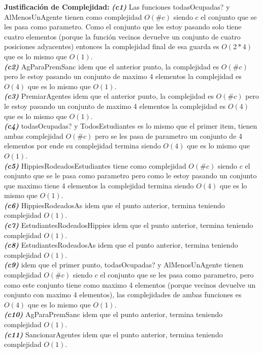 \textbf{Justificación de Complejidad:} \textit{\textbf{(c1)}} Las funciones todasOcupadas? y AlMenosUnAgente tienen como complejidad $O(\#c)$ siendo $c$ el conjunto que se les pasa como parametro. Como el conjunto que les estoy pasando solo tiene cuatro elementos (porque la función vecinos devuelve un conjunto de cuatro posiciones adyacentes) entonces la complejidad final de esa guarda es $O(2*4)$ que es lo mismo que $O(1)$. \\
\textit{\textbf{(c2)}} AgParaPremSanc idem que el anterior punto, la complejidad es $O(\#c)$ pero le estoy pasando un conjunto de maximo 4  elementos la complejidad es $O(4)$ que es lo mismo que $O(1)$. \\
\textit{\textbf{(c3)}} PremiarAgentes idem que el anterior punto, la complejidad es $O(\#c)$ pero le estoy pasando un conjunto de maximo 4 elementos la complejidad es $O(4)$ que es lo mismo que $O(1)$. \\
\textit{\textbf{(c4)}} todasOcupadas? y TodosEstudiantes es lo mismo que el primer item, tienen ambas complejidad $O(\#c)$ pero se les pasa de parametro un conjunto de 4 elementos por ende su complejidad termina siendo $O(4)$ que es lo mismo que $O(1)$. \\
\textit{\textbf{(c5)}} HippiesRodeadosEstudiantes tiene como complejidad $O(\#c)$ siendo $c$ el conjunto que se le pasa como parametro pero como le estoy pasando un conjunto que maximo tiene 4 elementos la complejidad termina siendo $O(4)$ que es lo mismo que $O(1)$. \\
\textit{\textbf{(c6)}} HippiesRodeadosAs idem que el punto anterior, termina teniendo complejidad $O(1)$. \\
\textit{\textbf{(c7)}} EstudiantesRodeadosHippies idem que el punto anterior, termina teniendo complejidad $O(1)$. \\
\textit{\textbf{(c8)}} EstudiantesRodeadosAs idem que el punto anterior, termina teniendo complejidad $O(1)$. \\
\textit{\textbf{(c9)}} idem que el primer punto, todasOcupadas? y AlMenosUnAgente tienen complejidad $O(\#c)$ siendo $c$ el conjunto que se les pasa como parametro, pero como este conjunto tiene como maximo 4 elementos (porque vecinos devuelve un conjunto con maximo 4 elementos), las complejidades de ambas funciones es $O(4)$ que es lo mismo que $O(1)$. \\
\textit{\textbf{(c10)}} AgParaPremSanc idem que el punto anterior, termina teniendo complejidad $O(1)$. \\
\textit{\textbf{(c11)}} SancionarAgentes idem que el punto anterior, termina teniendo complejidad $O(1)$. \\
